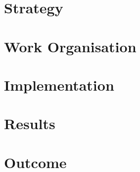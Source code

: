 \documentclass{report}
\begin{document}
\chapter{Strategy}
\label{chap:strategy}

\chapter{Work Organisation}
\label{chap:wo}

\chapter{Implementation}
\label{chap:impl}

\chapter{Results}
\label{chap:results}

\chapter{Outcome}
\label{chap:outcome}
\end{document}
